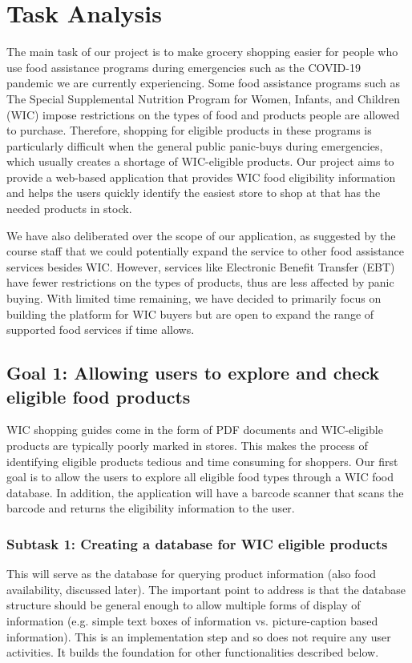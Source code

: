 \documentclass{article}
\begin{document}
\section{Task Analysis}
The main task of our project is to make grocery shopping easier for people who use food assistance programs during emergencies such as the COVID-19 pandemic we are currently experiencing. Some food assistance programs such as The Special Supplemental Nutrition Program for Women, Infants, and Children (WIC) impose restrictions on the types of food and products people are allowed to purchase. Therefore, shopping for eligible products in these programs is particularly difficult when the general public panic-buys during emergencies, which usually creates a shortage of WIC-eligible products. Our project aims to provide a web-based application that provides WIC food eligibility information and helps the users quickly identify the easiest store to shop at that has the needed products in stock. \par
We have also deliberated over the scope of our application, as suggested by the course staff that we could potentially expand the service to other food assistance services besides WIC. However, services like Electronic Benefit Transfer (EBT) have fewer restrictions on the types of products, thus are less affected by panic buying. With limited time remaining, we have decided to primarily focus on building the platform for WIC buyers but are open to expand the range of supported food services if time allows. 
\subsection*{Goal 1: Allowing users to explore and check eligible food products}

WIC shopping guides come in the form of PDF documents and WIC-eligible products are typically poorly marked in stores. This makes the process of identifying eligible products tedious and time consuming for shoppers. Our first goal is to allow the users to explore all eligible food types through a WIC food database. In addition, the application will have a barcode scanner that scans the barcode and returns the eligibility information to the user.

\subsubsection*{Subtask 1: Creating a database for WIC eligible products}
This will serve as the database for querying product information (also food availability, discussed later). The important point to address is that the database structure should be general enough to allow multiple forms of display of information (e.g. simple text boxes of information vs. picture-caption based information). This is an implementation step and so does not require any user activities. It builds the foundation for other functionalities described below.
\end{document}
